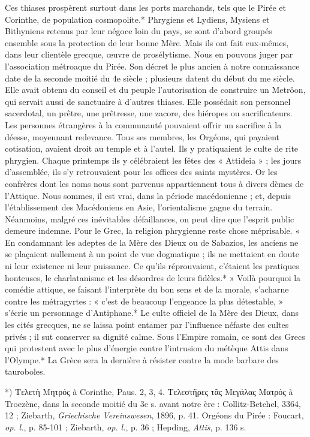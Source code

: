 \documentclass[a4paper, 11pt, oneside, polutonikogreek, french]{article}
\begin{document}
Ces thiases prospèrent surtout dans les ports marchands, tels que le Pirée et Corinthe, de population cosmopolite.* Phrygiens et Lydiens, Mysiens et Bithyniens retenus par leur négoce loin du pays, se sont d'abord groupés ensemble sous la protection de leur bonne Mère. Mais ils ont fait eux-mêmes, dans leur clientèle grecque, œuvre de prosélytisme. Nous en pouvons juger par l'association métroaque du Pirée. Son décret le plus ancien à notre connaissance date de la seconde moitié du 4e siècle ; plusieurs datent du début du me siècle. Elle avait obtenu du conseil et du peuple l'autorisation de construire un Metrôon, qui servait aussi de sanctuaire à d'autres thiases. Elle possédait son personnel sacerdotal, un prêtre, une prêtresse, une zacore, des hiéropes ou sacrificateurs. Les personnes étrangères à la communauté pouvaient offrir un sacrifice à la déesse, moyennant redevance. Tous ses membres, les Orgéons, qui payaient cotisation, avaient droit au temple et à l'autel. Ils y pratiquaient le culte de rite phrygien. Chaque printemps ils y célébraient les fêtes des « Attideia » ; les jours d'assemblée, ils s'y retrouvaient pour les offices des saints mystères. Or les confrères dont les noms nous sont parvenus appartiennent tous à divers dèmes de l'Attique. Nous sommes, il est vrai, dans la période macédonienne ; et, depuis l'établissement des Macédoniens en Asie, l'orientalisme gagne du terrain. Néanmoins, malgré ces inévitables défaillances, on peut dire que l'esprit public demeure indemne. Pour le Grec, la religion phrygienne reste chose méprisable. « En condamnant les adeptes de la Mère des Dieux ou de Sabazios, les anciens ne se plaçaient nullement à un point de vue dogmatique ; ils ne mettaient en doute ni leur existence ni leur puissance. Ce qu'ils réprouvaient, c'étaient les pratiques honteuses, le charlatanisme et les désordres de leurs fidèles.* » Voilà pourquoi la comédie attique, se faisant l'interprète du bon sens et de la morale, s'acharne contre les métragyrtes : « c'est de beaucoup l'engeance la plus détestable, » s'écrie un personnage d'Antiphane.* Le culte officiel de la Mère des Dieux, dans les cités grecques, ne se laissa point entamer par l'influence néfaste des cultes privés ; il sut conserver sa dignité calme. Sous l'Empire romain, ce sont des Grecs qui protestent avec le plus d'énergie contre l'intrusion du métèque Attis dans l'Olympe.* La Grèce sera la dernière à résister contre la mode barbare des tauroboles.

*) Τελετὴ Μητρός à Corinthe, Paus. 2, 3, 4. Τελεστῆρες τᾶς Μεγάλας Ματρός à Troezène, dans la seconde moitié du 3e s. avant notre ère : Collitz-Betchel, 3364, 12 ; Ziebarth, \emph{Griechische Vereinswesen}, 1896, p. 41. Orgéons du Pirée : Foucart, \emph{op. l.}, p. 85-101 ; Ziebarth, \emph{op. l.}, p. 36 ; Hepding, \emph{Attis}, p. 136 s.
\end{document}
